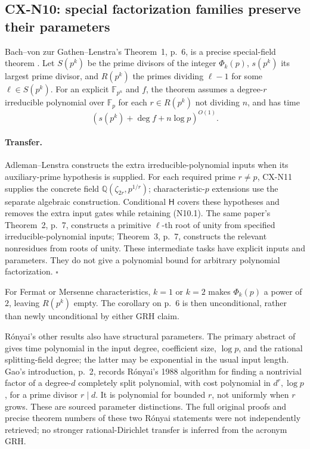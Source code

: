 \subsection{CX-N10: special factorization families preserve their parameters}
\label{cx-n10}

Bach--von zur Gathen--Lenstra's Theorem~1, p.~6, is a precise
special-field theorem \cite{CXNBGL01}. Let \(S(p^k)\) be the prime
divisors of the integer \(\Phi_k(p)\), \(s(p^k)\) its largest prime
divisor, and \(R(p^k)\) the primes dividing \(\ell-1\) for some
\(\ell\in S(p^k)\). For an explicit \(\mathbb F_{p^n}\) and \(f\),
the theorem assumes a degree-\(r\) irreducible polynomial over
\(\mathbb F_p\) for each \(r\in R(p^k)\) not dividing \(n\), and has time
\[
                     (s(p^k)+\deg f+n\log p)^{O(1)}.            \tag{N10.1}
\]

\paragraph{Transfer.}
Adleman--Lenstra constructs the extra irreducible-polynomial inputs
when its auxiliary-prime hypothesis is supplied.
For each required prime \(r\ne p\), CX-N11 supplies the concrete
field \(\mathbb Q(\zeta_{2r},p^{1/r})\); characteristic-\(p\)
extensions use the separate algebraic construction.
Conditional \(\mathsf H\) covers these hypotheses and removes the
extra input gates while retaining (N10.1).
The same paper's Theorem~2, p.~7, constructs a primitive
\(\ell\)-th root of unity from specified irreducible-polynomial inputs;
Theorem~3, p.~7, constructs the relevant nonresidues from roots of
unity. These intermediate tasks have explicit inputs and parameters.
They do not give a polynomial bound for arbitrary polynomial
factorization. \(\square\)

For Fermat or Mersenne characteristics, \(k=1\) or \(k=2\) makes
\(\Phi_k(p)\) a power of \(2\), leaving \(R(p^k)\) empty.
The corollary on p.~6 is then unconditional, rather than newly
unconditional by either GRH claim.

R\'onyai's other results also have structural parameters.
The primary abstract of \cite{CXNRonyai92} gives time polynomial in
the input degree, coefficient size, \(\log p\), and the rational
splitting-field degree; the latter may be exponential in the usual
input length. Gao's introduction, p.~2, records R\'onyai's 1988
algorithm for finding a nontrivial factor of a degree-\(d\) completely
split polynomial, with cost polynomial in \(d^r,\log p\), for a
prime divisor \(r\mid d\). It is polynomial for bounded \(r\), not
uniformly when \(r\) grows. These are sourced parameter distinctions.
The full original proofs and precise theorem numbers of these two
R\'onyai statements were not independently retrieved; no stronger
rational-Dirichlet transfer is inferred from the acronym GRH.
